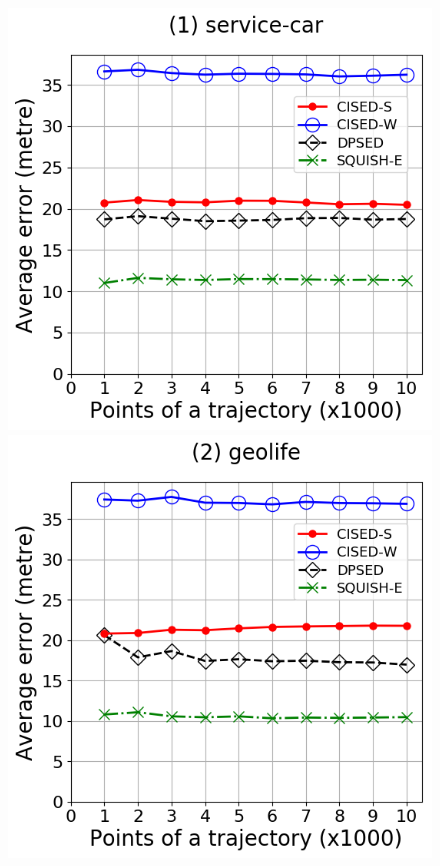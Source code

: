 {\begin{figure}[tb!]
	\centering
	\includegraphics[scale = 0.2900]{Figures/Exp-error-size-service.png}\hspace{1ex}
	\includegraphics[scale = 0.2900]{Figures/Exp-error-size-geolife.png}\hspace{1ex}

\end{figure}}
